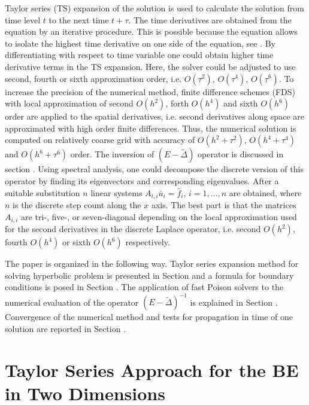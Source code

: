 \documentclass[11pt,a4paper,twoside]{article}
\begin{document}
Taylor series (TS) expansion of the solution   is used to calculate the solution from time level $t$ to the next time  $t+\tau$.
The time derivatives
are obtained from the equation  by an iterative procedure. This is possible because the equation allows to isolate the highest time derivative on one side of the equation, see . By differentiating with respect to time variable one could obtain higher time derivative terms in the TS expansion. Here, the solver could be adjusted to use second, fourth or sixth approximation order, i.e. $O(\tau^2)$, $O(\tau^4)$, $O(\tau^6)$. To increase the precision of the numerical method, finite difference schemes (FDS) with local approximation of second $O(h^2)$, forth $O(h^4)$ and sixth $O(h^6)$ order are  applied to the spatial derivatives, i.e.  second derivatives along space are approximated with high order finite differences. Thus, the numerical solution is computed on relatively coarse grid with  accuracy of $O(h^2+\tau^2)$, $O(h^4+\tau^4)$ and $O(h^6+\tau^6)$ order. The inversion of $(E - \tilde \Delta)$ operator is discussed in section . Using spectral analysis, one could decompose the discrete version of this operator by finding its eigenvectors and corresponding eigenvalues. After a suitable substitution $n$ linear systems $A_{i,i} \bar u_i = \bar f_i$, $i = 1,...,n$ are obtained, where $n$ is the discrete step count along the $x$ axis. The best part is that the matrices $A_{i,i}$ are tri-, five-, or seven-diagonal depending on the local approximation used for the second derivatives in the discrete Laplace operator, i.e. second $O(h^2)$,  fourth $O(h^4)$ or sixth $O(h^6)$ respectively. 

The paper is organized in the following way.  Taylor series expansion method for solving hyperbolic problem is presented in Section  and  a formula for boundary conditions is posed in  Section . The application of fast Poison solvers to the numerical evaluation of the operator $(E - \tilde \Delta)^{-1}$ is explained in Section  . Convergence of the numerical method and tests for propagation in time of one solution are reported in Section . 

\section{Taylor Series Approach for the BE in Two Dimensions}\label{TaylorA}
\end{document}
